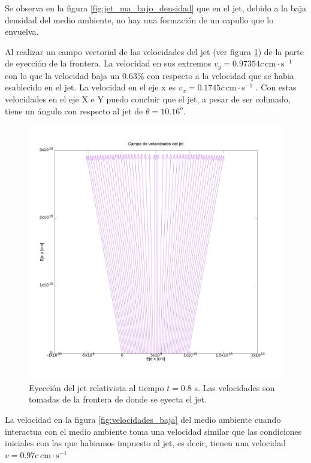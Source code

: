 \documentclass[12pt,a4paper]{book}
\begin{document}
Se observa en la figura \ref{fig:jet_ma_bajo_densidad} que en el jet, debido a la baja densidad del medio ambiente, no hay una formación de un capullo que lo envuelva.




Al realizar un campo vectorial de las velocidades del jet (ver figura \ref{fig:vector_velocidades_baja}) de la parte de eyección de la frontera. La velocidad en sus extremos $v_{y} = 0.97354 c \, \mathrm{cm} \cdot \mathrm{s}^{-1}$ con lo que la velocidad baja un 0.63\% con respecto a la velocidad que se habia esablecido en el jet. La velocidad en el eje x es $v_{x} = 0.1745 c \, \mathrm{cm} \cdot \mathrm{s}^{-1}$ . Con estas velocidades en el eje X e Y puedo concluir que el jet, a pesar de ser colimado, tiene un ángulo con respecto al jet de $\theta  = 10.16^{o}$.

\begin{figure}
\centering
\includegraphics[scale=0.15]{./Figuras/densidad_de_medios_ambientes/medio_bajo/vel_vector_t80_ma_10^-10}
\caption{\label{fig:vector_velocidades_baja}Eyección del jet relativista al tiempo $t = 0.8$ s. Las velocidades son tomadas de la frontera de donde se eyecta el jet.}
\end{figure}

La velocidad en la figura \ref{fig:velocidades_baja} del medio ambiente cuando interactua con el medio ambiente toma una velocidad similar que las condiciones iniciales con las que habiamos impuesto al jet, es decir, tienen una velocidad $v = 0.97\mathrm{c} \, \mathrm{cm} \cdot \mathrm{s}^{-1}$ 
\end{document}
